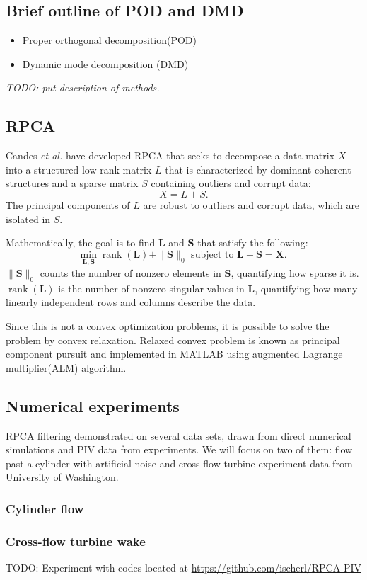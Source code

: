 \documentclass[12pt,letterpaper]{report}
\begin{document}
\subsection*{Brief outline of POD and DMD}
\begin{itemize}
	\item Proper orthogonal decomposition(POD) 
	
	
	
	
	\item Dynamic mode decomposition (DMD)
\end{itemize}
\textit{TODO: put description of methods.}

\subsection*{RPCA}
Candes \textit{et al.} \cite{rpca} have developed RPCA  that seeks to decompose a data matrix $X$ into a structured low-rank matrix $L$ that is characterized by dominant coherent structures and a sparse matrix $S$ containing
outliers and corrupt data:
\begin{equation}
	X=L+S.
\end{equation}
The principal components of $L$ are robust to outliers and corrupt data, which are isolated in $S$.

Mathematically, the goal is to find $\mathbf{L}$ and $\mathbf{S}$ that satisfy the following:
$$
\min _{\mathbf{L}, \mathbf{S}} \operatorname{rank}(\mathbf{L})+\|\mathbf{S}\|_0 \text { subject to } \mathbf{L}+\mathbf{S}=\mathbf{X} \text {. }
$$
$\|\mathbf{S}\|_0$ counts the number of nonzero elements in $\mathbf{S}$, quantifying how sparse it is. $\operatorname{rank}(\mathbf{L})$ is the number of nonzero singular values in $\mathbf{L}$, quantifying how many linearly independent rows and columns describe the data. 

Since this is not a convex optimization problems, it is possible to solve the problem by convex relaxation. Relaxed convex problem is known as principal component pursuit and implemented in MATLAB using augmented Lagrange multiplier(ALM) algorithm.

\subsection*{Numerical experiments}
RPCA filtering demonstrated on several data sets, drawn from direct numerical simulations and PIV data from experiments. We will focus on two of them: flow past a cylinder with artificial noise and cross-flow turbine experiment data from University of Washington.

\subsubsection*{Cylinder flow}

\subsubsection*{Cross-flow turbine wake}

TODO: Experiment with codes located at \url{https://github.com/ischerl/RPCA-PIV}





\end{document}
